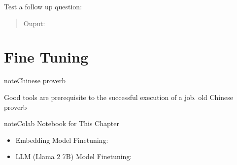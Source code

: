 \documentclass[letterpaper,11pt,english]{sphinxmanual}
\begin{document}
\sphinxAtStartPar
Test a follow up question:
\begin{quote}

\begin{sphinxVerbatim}[commandchars=\\\{\}]
         
         \PYG{p}{[} \PYG{p}{]}
\end{sphinxVerbatim}

\sphinxAtStartPar
Ouput:

\begin{sphinxVerbatim}[commandchars=\\\{\}]
         
\end{sphinxVerbatim}
\end{quote}

\sphinxstepscope


\chapter{Fine Tuning}
\label{\detokenize{finetuning:fine-tuning}}\label{\detokenize{finetuning:finetuning}}\label{\detokenize{finetuning::doc}}
\begin{sphinxadmonition}{note}{Chinese proverb}

\sphinxAtStartPar
Good tools are prerequisite to the successful execution of a job. \textendash{} old Chinese proverb
\end{sphinxadmonition}

\begin{sphinxadmonition}{note}{Colab Notebook for This Chapter}
\begin{itemize}
\item {} 
\sphinxAtStartPar
Embedding Model Fine\sphinxhyphen{}tuning: 

\item {} 
\sphinxAtStartPar
LLM (Llama 2 7B) Model Fine\sphinxhyphen{}tuning: 

\end{itemize}
\end{sphinxadmonition}
\end{document}
